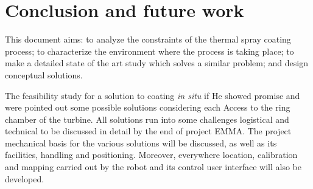 \section{Conclusion and future work}\label{sec:conclusions}
This document aims: to analyze the constraints of the thermal spray
coating process; to characterize the environment where the process is taking
place; to make a detailed state of the art study which solves a similar
problem; and design conceptual solutions.


The feasibility study for a solution to coating \textit{in situ} if
He showed promise and were pointed out some possible solutions considering each
Access to the ring chamber of the turbine. All solutions run into some challenges
logistical and technical to be discussed in detail by the end of project
EMMA. The project mechanical basis for the various solutions will be discussed,
as well as its facilities, handling and positioning. Moreover, everywhere
location, calibration and mapping carried out by the robot and its control
user interface will also be developed.

